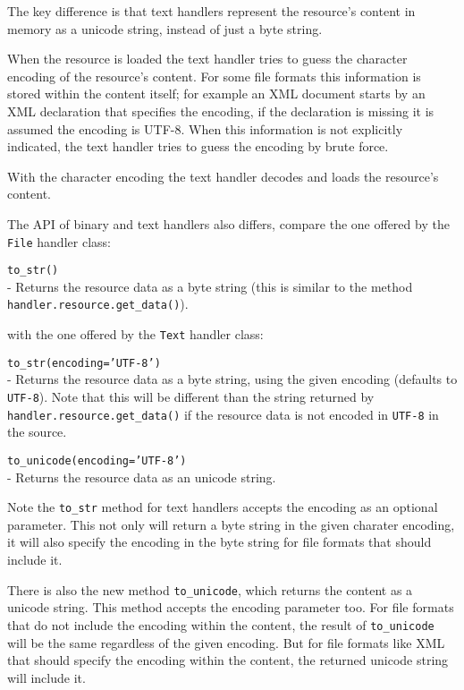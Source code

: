 The key difference is that text handlers represent the resource's content
in memory as a unicode string, instead of just a byte string.

When the resource is loaded the text handler tries to guess the character
encoding of the resource's content. For some file formats this information
is stored within the content itself; for example an XML document starts
by an XML declaration that specifies the encoding, if the declaration is
missing it is assumed the encoding is UTF-8. When this information is not
explicitly indicated, the text handler tries to guess the encoding by
brute force.

With the character encoding the text handler decodes and loads the resource's
content.

The API of binary and text handlers also differs, compare the one offered
by the {\tt File} handler class:

\begin{api}
  {\tt to\_str()}\\
  - Returns the resource data as a byte string (this is similar to the
    method {\tt handler.resource.get\_data()}).
\end{api}

with the one offered by the {\tt Text} handler class:

\begin{api}
  {\tt to\_str(encoding='UTF-8')}\\
  - Returns the resource data as a byte string, using the given encoding
  (defaults to {\tt UTF-8}). Note that this will be different than the
  string returned by {\tt handler.resource.get\_data()} if the resource
  data is not encoded in {\tt UTF-8} in the source.

  {\tt to\_unicode(encoding='UTF-8')}\\
  - Returns the resource data as an unicode string.
\end{api}

Note the {\tt to\_str} method for text handlers accepts the encoding as
an optional parameter. This not only will return a byte string in the
given charater encoding, it will also specify the encoding in the byte
string for file formats that should include it.

There is also the new method {\tt to\_unicode}, which returns the content
as a unicode string. This method accepts the encoding parameter too. For
file formats that do not include the encoding within the content, the
result of {\tt to\_unicode} will be the same regardless of the given
encoding. But for file formats like XML that should specify the encoding
within the content, the returned unicode string will include it.



